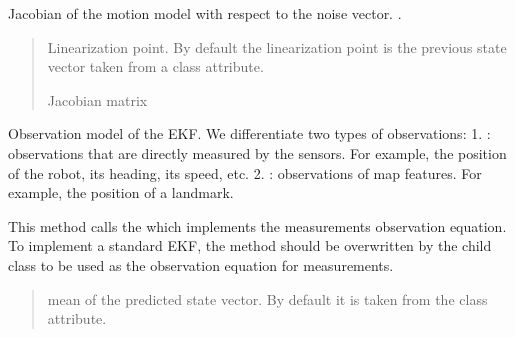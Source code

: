 \documentclass[letterpaper,10pt,english]{sphinxmanual}
\begin{document}
\begin{fulllineitems}
\begin{fulllineitems}
\end{fulllineitems}


\begin{fulllineitems}
\label{\detokenize{EKF:EKF.EKF.Jfw}}
\pysigstartsignatures
{}
\pysigstopsignatures
\sphinxAtStartPar
Jacobian of the motion model with respect to the noise vector. .
\begin{quote}\begin{description}
\sphinxAtStartPar
{} \textendash{} Linearization point. By default the linearization point is the previous state vector taken from a class attribute.

\sphinxAtStartPar
Jacobian matrix

\end{description}\end{quote}

\end{fulllineitems}


\begin{fulllineitems}
\label{\detokenize{EKF:EKF.EKF.h}}
\pysigstartsignatures
{}
\pysigstopsignatures
\sphinxAtStartPar
Observation model of the EKF. We differentiate two types of observations:
1. : observations that are directly measured by the sensors. For example, the position of the robot, its heading, its speed, etc.
2. : observations of map features. For example, the position of a landmark.

\sphinxAtStartPar
This method calls the {\hyperref[\detokenize{EKF:EKF.EKF.hm}]{}} which implements the measurements observation equation. To implement a standard EKF, the  method should be overwritten by the child class to be used as the observation equation for measurements.
\begin{quote}\begin{description}
\sphinxAtStartPar
{} \textendash{} mean of the predicted state vector. By default it is taken from the class attribute.


\end{description}
\end{quote}
\end{fulllineitems}
\end{fulllineitems}
\end{document}

